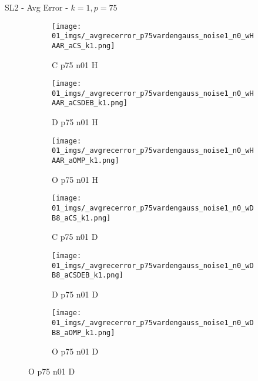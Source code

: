 \begin{frame}{SL2 - Avg Error - $k=1,p=75$}{}
\begin{figure}
\begin{subfigure}{0.13\textwidth}
\texttt{[image: 01\_imgs/\_avgrecerror\_p75vardengauss\_noise1\_n0\_wHAAR\_aCS\_k1.png]}
\caption*{\tiny C p75 n01 H}
\end{subfigure}
\begin{subfigure}{0.13\textwidth}
\texttt{[image: 01\_imgs/\_avgrecerror\_p75vardengauss\_noise1\_n0\_wHAAR\_aCSDEB\_k1.png]}
\caption*{\tiny D p75 n01 H}
\end{subfigure}
\begin{subfigure}{0.13\textwidth}
\texttt{[image: 01\_imgs/\_avgrecerror\_p75vardengauss\_noise1\_n0\_wHAAR\_aOMP\_k1.png]}
\caption*{\tiny O p75 n01 H}
\end{subfigure}
\begin{subfigure}{0.13\textwidth}
\texttt{[image: 01\_imgs/\_avgrecerror\_p75vardengauss\_noise1\_n0\_wDB8\_aCS\_k1.png]}
\caption*{\tiny C p75 n01 D}
\end{subfigure}
\begin{subfigure}{0.13\textwidth}
\texttt{[image: 01\_imgs/\_avgrecerror\_p75vardengauss\_noise1\_n0\_wDB8\_aCSDEB\_k1.png]}
\caption*{\tiny D p75 n01 D}
\end{subfigure}
\begin{subfigure}{0.13\textwidth}
\texttt{[image: 01\_imgs/\_avgrecerror\_p75vardengauss\_noise1\_n0\_wDB8\_aOMP\_k1.png]}
\caption*{\tiny O p75 n01 D}
\end{subfigure}

\vspace{5pt}


\end{figure}
\end{frame}
